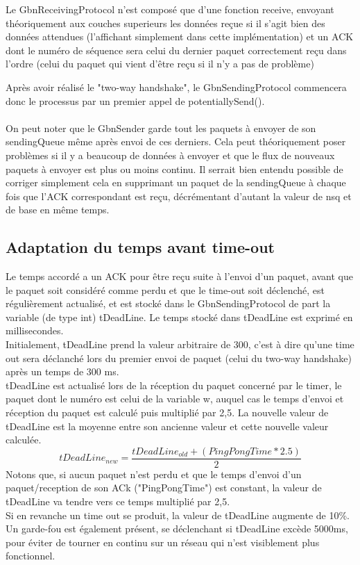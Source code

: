 \documentclass[11pt]{article}
\begin{document}
Le GbnReceivingProtocol n'est composé que d'une fonction receive, envoyant théoriquement aux couches superieurs les données reçue si il s'agit bien des données attendues (l'affichant simplement dans cette implémentation) et un ACK dont le numéro de séquence sera celui du dernier paquet correctement reçu dans l'ordre (celui du paquet qui vient d'être reçu si il n'y a pas de problème)

Après avoir réalisé le "two-way handshake", le GbnSendingProtocol commencera donc le processus par un premier appel de potentiallySend(). \\ \\
On peut noter que le GbnSender garde tout les paquets à envoyer de son sendingQueue même après envoi de ces derniers. Cela peut théoriquement poser problèmes si il y a beaucoup de données à envoyer et que le flux de nouveaux paquets à envoyer est plus ou moins continu. Il serrait bien entendu possible de corriger simplement cela en supprimant un paquet de la sendingQueue à chaque fois que l'ACK correspondant est reçu, décrémentant d'autant la valeur de nsq et de base en même temps.

\subsection{Adaptation du temps avant time-out}
Le temps accordé a un ACK pour être reçu suite à l'envoi d'un paquet, avant que le paquet soit considéré comme perdu et que le time-out soit déclenché, est régulièrement actualisé, et est stocké dans le GbnSendingProtocol de part la variable (de type int) tDeadLine. Le temps stocké dans tDeadLine est exprimé en millisecondes.\\
Initialement, tDeadLine prend la valeur arbitraire de 300, c'est à dire qu'une time out sera déclanché lors du premier envoi de paquet (celui du two-way handshake) après un temps de 300 ms.\\
tDeadLine est actualisé lors de la réception du paquet concerné par le timer, le paquet dont le numéro est celui de la variable w, auquel cas le temps d'envoi et réception du paquet est calculé puis multiplié par 2,5. La nouvelle valeur de tDeadLine est la moyenne entre son ancienne valeur et cette nouvelle valeur calculée. 
\[
   tDeadLine_{new} = \frac{tDeadLine_{old} + (PingPongTime * 2.5)}{2}
\]
Notons que, si aucun paquet n'est perdu et que le temps d'envoi d'un paquet/reception de son ACk ("PingPongTime") est constant, la valeur de tDeadLine va tendre vers ce temps multiplié par 2,5. \\
Si en revanche un time out se produit, la valeur de tDeadLine augmente de 10\%. Un garde-fou est également présent, se déclenchant si tDeadLine excède 5000ms, pour éviter de tourner en continu sur un réseau qui n'est visiblement plus fonctionnel.
\end{document}
